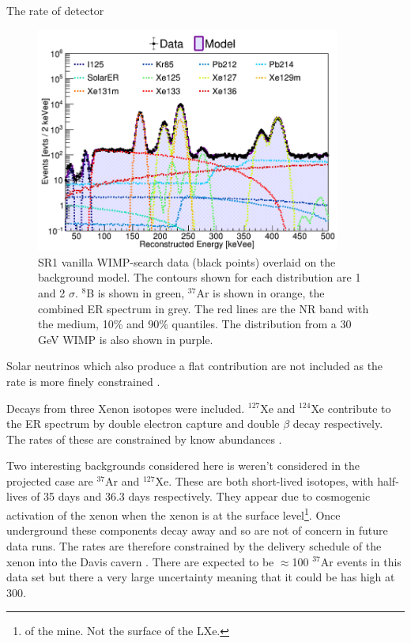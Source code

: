The rate of detector 

\begin{figure}
    \centering
    \includegraphics[width=10cm]{Figures/EFT/All_SR1_Plots/ER_band_fit.png}
    \caption{SR1 vanilla WIMP-search data (black points) overlaid on the background model.
    The contours shown for each distribution are 1 and 2 $\sigma$.
    ${}^{8}$B is shown in green, ${}^{37}$Ar is shown in orange, the combined ER spectrum in grey.
    The red lines are the NR band with the medium, 10\% and 90\% quantiles.
    The distribution from a 30 GeV WIMP is also shown in purple. 
    }
    \label{fig:sr1_spectra}
\end{figure}


\par
Solar neutrinos which also produce a flat contribution are not included as the rate is more finely constrained \cite{pp_solar_neutrinos_rate_ref}.
\par
Decays from three Xenon isotopes were included.
${}^{127}$Xe and ${}^{124}$Xe contribute to the ER spectrum by double electron capture and double $\beta$ decay respectively.
The rates of these are constrained by know abundances \cite{xenon_isotopes_ref}.
\par
Two interesting backgrounds considered here is weren't considered in the projected case are ${}^{37}$Ar and ${}^{127}$Xe.
These are both short-lived isotopes, with half-lives of 35 days and 36.3 days respectively.
They appear due to cosmogenic activation of the xenon when the xenon is at the surface level\footnote{of the mine. Not the surface of the LXe.}.
Once underground these components decay away and so are not of concern in future data runs.
The rates are therefore constrained by the delivery schedule of the xenon into the Davis cavern \cite{lz_argon37_ref}.
There are expected to be $\approx$100 ${}^{37}$Ar events in this data set but there a very large uncertainty meaning that it could be has high at 300.


